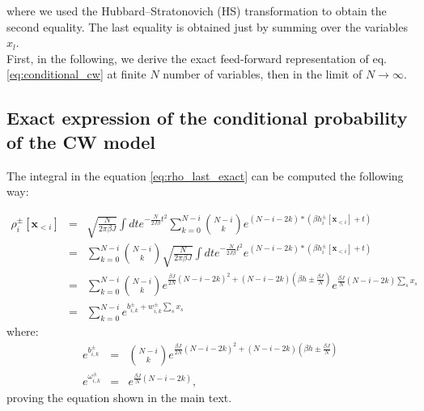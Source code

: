 \documentclass[10pt, notitlepage]{revtex4-2}
\begin{document}
 where we used the Hubbard–Stratonovich (HS) transformation to obtain the second equality. The last equality is obtained just by summing over the variables $x_l$.\\
 First, in the following, we derive the exact feed-forward representation of eq.\ref{eq:conditional_cw} at finite $N$ number of variables, then in the limit of $N\rightarrow \infty$.\\

 \subsection{Exact expression of the conditional probability of the CW model}
 The integral in the equation \ref{eq:rho_last_exact} can be computed the following way:

 \begin{eqnarray*}
 \rho_i^{\pm}[\mathbf{x}_{<i}] &=& \sqrt{\frac{N}{2\pi \beta J}}\int dt e^{-\frac{N}{2J \beta}t^{2}} 
 \sum_{k=0}^{N-i} \binom{N-i}{k} e^{(N-i-2k)*(\beta h_i^{\pm}[\mathbf{x}_{<i}] + t)}\\
 &=& \sum_{k=0}^{N-i} \binom{N-i}{k} \sqrt{\frac{N}{2\pi \beta J}}\int dt e^{-\frac{N}{2J \beta}t^{2}} 
  e^{(N-i-2k)*(\beta h_i^{\pm}[\mathbf{x}_{<i}] + t)}\\
&=& \sum_{k=0}^{N-i} \binom{N-i}{k}e^{\frac{\beta J}{2N}\left(N-i-2k\right)^{2}+\left(N-i-2k\right)\left(\beta h \pm \frac{\beta J}{N}\right)} e^{\frac{\beta J}{N}\left(N-i-2k\right) \sum_s x_s} \\
&=& \sum_{k=0}^{N-i} e^{b_{i,k}^{\pm} + w_{i,k}^{\pm} \sum_s x_s} 
\end{eqnarray*}
where:
\begin{eqnarray}
\label{eq:params}
e^{b_{i,k}^{\pm}} & = & \binom{N-i}{k}e^{\frac{\beta J}{2N}\left(N-i-2k\right)^{2}+\left(N-i-2k\right)\left(\beta h \pm \frac{\beta J}{N}\right)}\\
e^{\omega_{i,k}^{\pm}} & = & e^{\frac{\beta J}{N}\left(N-i-2k\right)},
\end{eqnarray}
proving the equation shown in the main text.
\end{document}
